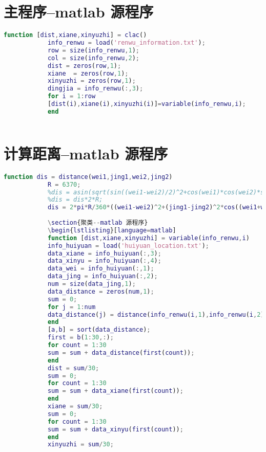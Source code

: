 \documentclass[withoutpreface,bwprint]{cumcmthesis} %
\begin{document}
			\newpage
			\appendix
			\section{主程序--matlab 源程序}
			\begin{lstlisting}[language=matlab]
			function [dist,xiane,xinyuzhi] = clac()
			info_renwu = load('renwu_information.txt');
			row = size(info_renwu,1);
			col = size(info_renwu,2);
			dist = zeros(row,1);
			xiane  = zeros(row,1);
			xinyuzhi = zeros(row,1);
			dingjia = info_renwu(:,3);
			for i = 1:row
			[dist(i),xiane(i),xinyuzhi(i)]=variable(info_renwu,i); 
			end
			
			\end{lstlisting}
			
			\section{计算距离--matlab 源程序}
			\begin{lstlisting}[language=matlab]
			function dis = distance(wei1,jing1,wei2,jing2)
			R = 6370;
			%dis = asin(sqrt(sin((wei1-wei2)/2)^2+cos(wei1)*cos(wei2)*sin((jing1-jing2)/2)^2));
			%dis = dis*2*R;
			dis = 2*pi*R/360*((wei1-wei2)^2+(jing1-jing2)^2*cos((wei1+wei2)/2)^2)^0.5;
			
			\section{聚类--matlab 源程序}
			\begin{lstlisting}[language=matlab]
			function [dist,xiane,xinyuzhi] = variable(info_renwu,i)
			info_huiyuan = load('huiyuan_location.txt');
			data_xiane = info_huiyuan(:,3);
			data_xinyu = info_huiyuan(:,4);
			data_wei = info_huiyuan(:,1);
			data_jing = info_huiyuan(:,2);
			num = size(data_jing,1);
			data_distance = zeros(num,1);
			sum = 0;
			for j = 1:num
			data_distance(j) = distance(info_renwu(i,1),info_renwu(i,2),info_huiyuan(j,1),info_huiyuan(j,2));
			end
			[a,b] = sort(data_distance);
			first = b(1:30,:);
			for count = 1:30
			sum = sum + data_distance(first(count));
			end
			dist = sum/30;
			sum = 0;
			for count = 1:30
			sum = sum + data_xiane(first(count));
			end
			xiane = sum/30;
			sum = 0;
			for count = 1:30
			sum = sum + data_xinyu(first(count));
			end
			xinyuzhi = sum/30;
			
			\end{lstlisting}
			
			
			
			
			
			
		
\end{document}
